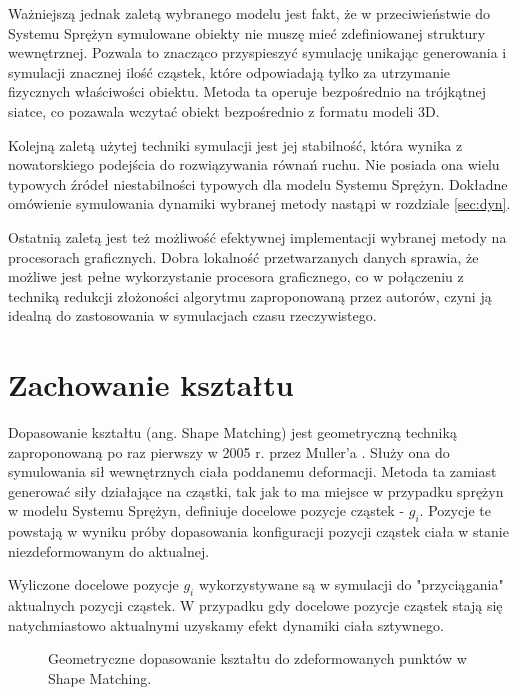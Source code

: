 Ważniejszą jednak zaletą wybranego modelu jest fakt, że w przeciwieństwie do
Systemu Sprężyn symulowane obiekty nie muszę mieć
zdefiniowanej struktury wewnętrznej. Pozwala to znacząco przyspieszyć symulację
unikając generowania i symulacji znacznej ilość cząstek, które odpowiadają tylko za
utrzymanie fizycznych właściwości obiektu. Metoda ta operuje bezpośrednio na
trójkątnej siatce, co pozawala wczytać obiekt bezpośrednio z formatu modeli
3D.

Kolejną zaletą użytej techniki symulacji jest jej stabilność, która wynika z
nowatorskiego podejścia do rozwiązywania równań ruchu. Nie posiada ona
wielu typowych źródeł niestabilności typowych dla modelu Systemu Sprężyn.
Dokładne omówienie symulowania dynamiki wybranej metody nastąpi w rozdziale
\ref{sec:dyn}.

Ostatnią zaletą jest też możliwość efektywnej implementacji wybranej metody na
procesorach graficznych. Dobra lokalność przetwarzanych danych sprawia, że
możliwe jest pełne wykorzystanie procesora graficznego, co w połączeniu z
techniką redukcji złożoności algorytmu zaproponowaną przez autorów, czyni ją
idealną do zastosowania w symulacjach czasu rzeczywistego.

\section{Zachowanie kształtu}
\label{sec:shape}
Dopasowanie kształtu (ang. Shape Matching) jest geometryczną techniką
zaproponowaną po raz pierwszy w 2005 r. przez Muller'a \cite{shape}. Służy ona do
symulowania sił wewnętrznych ciała poddanemu deformacji. Metoda ta zamiast
generować siły działające na cząstki, tak jak to ma miejsce w przypadku
sprężyn w modelu Systemu Sprężyn, definiuje docelowe pozycje cząstek - $g_i$.
Pozycje te powstają w wyniku próby dopasowania konfiguracji 
pozycji cząstek ciała w stanie niezdeformowanym do aktualnej.

Wyliczone docelowe pozycje $g_i$ wykorzystywane są w symulacji do "przyciągania"
aktualnych pozycji cząstek. W przypadku gdy docelowe pozycje cząstek stają się
natychmiastowo aktualnymi uzyskamy efekt dynamiki ciała sztywnego.

\begin{figure}[ht]
\centering

\caption{Geometryczne dopasowanie kształtu do zdeformowanych punktów w Shape Matching.}
\label{shape-matching}
\end{figure}

